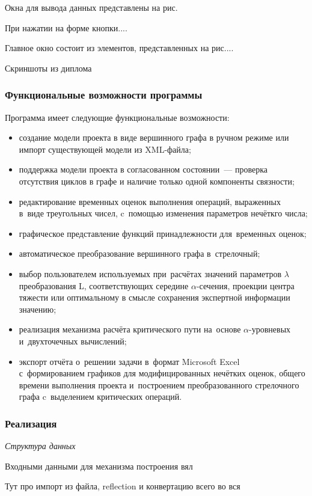Окна для вывода данных представлены на рис.

При нажатии на форме кнопки....

Главное окно состоит из элементов, представленных на рис....

Скриншоты из диплома

\subsubsection*{Функциональные возможности программы}
Программа имеет следующие функциональные возможности:
\begin{itemize}
  \item создание модели проекта в виде вершинного графа в ручном режиме или импорт существующей модели из XML-файла;
  \item поддержка модели проекта в согласованном состоянии~--- проверка отсутствия циклов в графе и наличие только одной компоненты связности;
  \item редактирование временных оценок выполнения операций, выраженных в~виде треугольных чисел, c~помощью изменения параметров нечёткго числа;
  \item графическое представление функций принадлежности для~временных оценок;
  \item автоматическое преобразование вершинного графа в~стрелочный;
  \item выбор пользователем используемых при~расчётах значений параметров $\lambda$ преобразования L, соответствующих середине $\alpha$-сечения, проекции центра тяжести или оптимальному в смысле сохранения экспертной информации значению;
  \item реализация механизма расчёта критического пути на~основе $\alpha$-уровневых и~двухточечных вычислений;
  \item экспорт отчёта о~решении задачи в~формат Microsoft Excel с~формированием графиков для модифицированных нечётких оценок, общего времени выполнения проекта и~построением преобразованного стрелочного графа c~выделением критических операций.
\end{itemize}

\subsubsection*{Реализация}

\textit{Структура данных}

Входными данными для механизма построения вял

Тут про импорт из файла, reflection и конвертацию всего во вся

